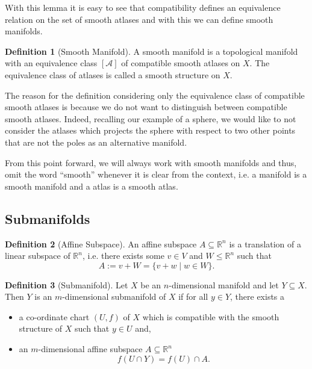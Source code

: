 \documentclass[]{article}
\theoremstyle{definition}
\theoremstyle{definition}
\newtheorem{definition}{Definition}[section]
\begin{document}
With this lemma it is easy to see that compatibility defines an equivalence 
relation on the set of smooth atlases and with this we can define smooth 
manifolds.

\begin{definition}[Smooth Manifold]
  A smooth manifold is a topological manifold with an equivalence class 
  \([\mathcal{A}]\) of compatible smooth atlases on \(X\). The equivalence 
  class of atlases is called a smooth structure on \(X\).
\end{definition}

The reason for the definition considering only the equivalence class 
of compatible smooth atlases is because we do not want to distinguish between 
compatible smooth atlases. Indeed, recalling our example of a sphere, 
we would like to not consider the atlases which projects the sphere with 
respect to two other points that are not the poles as an alternative manifold.

From this point forward, we will always work with smooth manifolds and thus, 
omit the word ``smooth'' whenever it is clear from the context, i.e. a manifold 
is a smooth manifold and a atlas is a smooth atlas. 

\subsection{Submanifolds}

\begin{definition}[Affine Subspace]
  An affine subspace \(A \subseteq \mathbb{R}^n\) is a translation of a 
  linear subspace of \(\mathbb{R}^n\), i.e. there exists some \(v \in V\) and 
  \(W \le \mathbb{R}^n\) such that 
  \[A := v + W = \{v + w \mid w \in W\}.\]
\end{definition}

\begin{definition}[Submanifold]
  Let \(X\) be an \(n\)-dimensional manifold and let \(Y \subseteq X\). Then 
  \(Y\) is an \(m\)-dimensional submanifold of \(X\) if for all \(y \in Y\), 
  there exists a 
  \begin{itemize}
    \item a co-ordinate chart \((U, f)\) of \(X\) which is compatible with 
      the smooth structure of \(X\) such that \(y \in U\) and,
    \item an \(m\)-dimensional affine subspace \(A \subseteq \mathbb{R}^n\) 
      \[f(U \cap Y) = f(U) \cap A.\]
  \end{itemize}
\end{definition}
\end{document}
